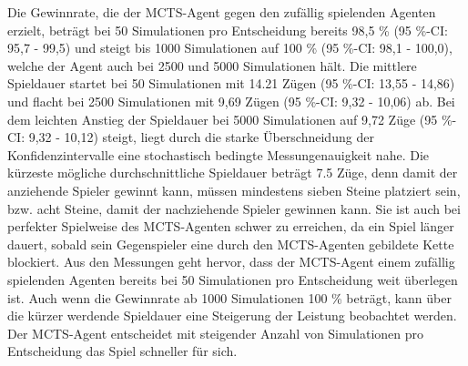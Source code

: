 Die Gewinnrate, die der MCTS-Agent gegen den zufällig spielenden Agenten erzielt, beträgt bei 50 Simulationen pro Entscheidung bereits 98,5 \% (95 \%-CI: 95,7 - 99,5) und steigt bis 1000 Simulationen auf 100 \% (95 \%-CI: 98,1 - 100,0), welche der Agent auch bei 2500 und 5000 Simulationen hält. Die mittlere Spieldauer startet bei 50 Simulationen mit 14.21 Zügen (95 \%-CI: 13,55 - 14,86) und flacht bei 2500 Simulationen mit 9,69 Zügen (95 \%-CI: 9,32 - 10,06) ab. Bei dem leichten Anstieg der Spieldauer bei 5000 Simulationen auf 9,72 Züge (95 \%-CI: 9,32 - 10,12) steigt, liegt durch die starke Überschneidung der Konfidenzintervalle eine stochastisch bedingte Messungenauigkeit nahe. Die kürzeste mögliche durchschnittliche Spieldauer beträgt 7.5 Züge, denn damit der anziehende Spieler gewinnt kann, müssen mindestens sieben Steine platziert sein, bzw. acht Steine, damit der nachziehende Spieler gewinnen kann. Sie ist auch bei perfekter Spielweise des MCTS-Agenten schwer zu erreichen, da ein Spiel länger dauert, sobald sein Gegenspieler eine durch den MCTS-Agenten gebildete Kette blockiert. Aus den Messungen geht hervor, dass der MCTS-Agent einem zufällig spielenden Agenten bereits bei 50 Simulationen pro Entscheidung weit überlegen ist. Auch wenn die Gewinnrate ab 1000 Simulationen 100 \% beträgt, kann über die kürzer werdende Spieldauer eine Steigerung der Leistung beobachtet werden. Der MCTS-Agent entscheidet mit steigender Anzahl von Simulationen pro Entscheidung das Spiel schneller für sich.

